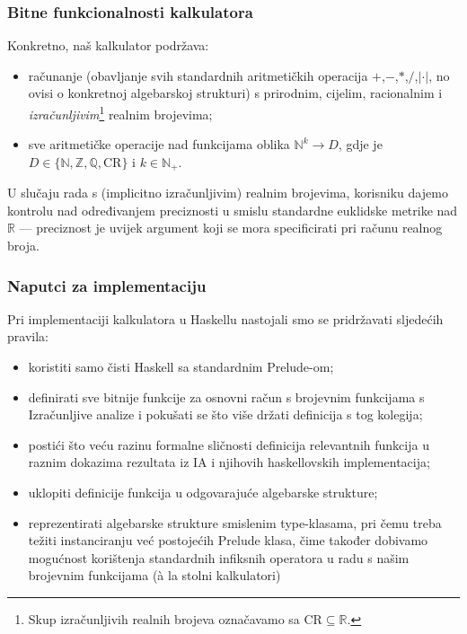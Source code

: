 \documentclass{beamer}
\def\N{\mathbb{N}}
\def\Z{\mathbb{Z}}
\def\Q{\mathbb{Q}}
\def\R{\mathbb{R}}
\def\CR{\mathrm{CR}}
\begin{document}
\begin{frame}
\frametitle{Bitne funkcionalnosti kalkulatora}
Konkretno, naš kalkulator podržava:
\begin{itemize}
    \item računanje (obavljanje svih standardnih aritmetičkih
    operacija 
    $+$,$-$,$*$,$/$,$|\cdot|$, no ovisi o konkretnoj algebarskoj
    strukturi) s prirodnim, cijelim, racionalnim i 
    \emph{izračunljivim}\footnote{Skup izračunljivih realnih brojeva
    označavamo sa $\CR\subseteq\R$.} realnim brojevima;
    \item sve aritmetičke operacije nad \alert{funkcijama} oblika
    $\N^k\to D$, gdje je $D\in\{\N,\Z,\Q,\CR\}$ i $k\in\N_+$.
\end{itemize}
U slučaju rada s (implicitno izračunljivim) realnim brojevima,
    korisniku dajemo kontrolu nad određivanjem preciznosti u smislu
    standardne euklidske metrike nad $\R$ --- preciznost je uvijek
    argument koji se mora specificirati pri računu realnog broja.
\end{frame}

\begin{frame}
    \frametitle{Naputci za implementaciju}
    Pri implementaciji kalkulatora u Haskellu nastojali smo se
    pridržavati sljedećih pravila: 
    \begin{itemize}
        \pause
        \item koristiti samo čisti Haskell sa standardnim Prelude-om;
        \pause
        \item definirati sve bitnije funkcije za osnovni račun s brojevnim funkcijama s Izračunljive analize i pokušati se što više
        držati definicija s tog kolegija;
        \pause
        \item postići što veću razinu formalne sličnosti definicija
        relevantnih
        funkcija u raznim dokazima rezultata iz IA i njihovih
        haskellovskih implementacija;
        \pause
        \item uklopiti definicije funkcija u odgovarajuće algebarske
        strukture;
        \pause
        \item reprezentirati algebarske strukture smislenim type-klasama,
        pri čemu treba težiti instanciranju već postojećih Prelude
        klasa, čime također dobivamo mogućnost korištenja standardnih
        infiksnih operatora u radu s našim brojevnim funkcijama
        (à la stolni kalkulatori) 
    \end{itemize}
\end{frame}
\end{document}
